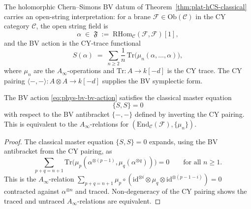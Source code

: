 
The holomorphic Chern--Simons BV datum of Theorem~\ref{thm:plat-hCS-classical} carries an open-string interpretation: for a brane $\mathcal{F} \in \mathrm{Ob}(\mathcal{C})$ in the CY category $\mathcal{C}$, the open string field is
\[
 \alpha \;\in\; \mathfrak{F} \;:=\; \mathrm{RHom}_\mathcal{C}(\mathcal{F}, \mathcal{F})[1],
\]
and the BV action is the CY-trace functional
\begin{equation}
\label{eq:phys-bv-bv-action}
 S(\alpha) \;=\; \sum_{n \geq 2} \frac{1}{n}\, \mathrm{Tr}\bigl(\mu_n(\alpha, \ldots, \alpha)\bigr),
\end{equation}
where $\mu_n$ are the $A_\infty$-operations and $\mathrm{Tr} \colon A \to k[-d]$ is the CY trace. The CY pairing $\langle -,- \rangle \colon A \otimes A \to k[-d]$ supplies the BV symplectic form.

\begin{proposition}[Classical master equation = \texorpdfstring{$A_\infty$}{A-inf} relations]
\label{prop:phys-bv-classical-me}
\ClaimStatusProvedHere
The BV action \eqref{eq:phys-bv-bv-action} satisfies the classical master equation
\[
 \{S, S\} = 0
\]
with respect to the BV antibracket $\{-,-\}$ defined by inverting the CY pairing. This is equivalent to the $A_\infty$-relations for $(\mathrm{End}_\mathcal{C}(\mathcal{F}), \{\mu_n\})$.
\end{proposition}

\begin{proof}
The classical master equation $\{S, S\} = 0$ expands, using the BV antibracket from the CY pairing, as
\[
 \sum_{p+q = n+1} \mathrm{Tr}\bigl(\mu_p(\alpha^{\otimes (p-1)}, \mu_q(\alpha^{\otimes q}))\bigr) = 0
 \qquad \text{for all } n \geq 1.
\]
This is the $A_\infty$-relation $\sum_{p+q=n+1} \mu_p \circ (\mathrm{id}^{\otimes i} \otimes \mu_q \otimes \mathrm{id}^{\otimes (p-1-i)}) = 0$ contracted against $\alpha^{\otimes n}$ and traced. Non-degeneracy of the CY pairing shows the traced and untraced $A_\infty$-relations are equivalent.
\end{proof}

